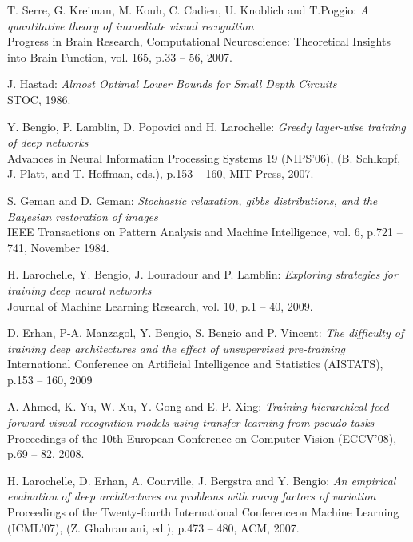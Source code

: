 \documentclass[a4paper,11pt]{report}
\begin{document}
\begin{thebibliography}{99}
	 T. Serre, G. Kreiman, M. Kouh, C. Cadieu, U. Knoblich and T.Poggio: {\em A quantitative theory of immediate visual recognition}\\
	Progress in Brain Research, Computational Neuroscience: Theoretical Insights into Brain Function, vol. 165, p.33 – 56, 2007.

	 J. Hastad: {\em Almost Optimal Lower Bounds for Small Depth Circuits}\\
	STOC, 1986.
	
	 Y. Bengio, P. Lamblin, D. Popovici and H. Larochelle: {\em Greedy layer-wise training of deep networks}\\
	Advances in Neural Information Processing Systems 19 (NIPS’06), (B. Schlkopf, J. Platt, and T. Hoffman, eds.), p.153 – 160, MIT Press, 2007.

	 S. Geman and D. Geman: {\em Stochastic relaxation, gibbs distributions, and the Bayesian restoration of images}\\
	IEEE Transactions on Pattern Analysis and Machine Intelligence, vol. 6, p.721 – 741, November 1984.

	 H. Larochelle, Y. Bengio, J. Louradour and P. Lamblin: {\em Exploring strategies for training deep neural networks}\\
	Journal of Machine Learning Research, vol. 10, p.1 – 40, 2009.
  
	 D. Erhan, P-A. Manzagol, Y. Bengio, S. Bengio and P. Vincent: {\em The difficulty of training deep architectures and the effect of unsupervised pre-training}\\
	International Conference on Artificial Intelligence and Statistics (AISTATS), p.153 – 160, 2009
  
	 A. Ahmed, K. Yu, W. Xu, Y. Gong and E. P. Xing: {\em Training hierarchical feed-forward visual recognition models using transfer learning from pseudo tasks}\\
	Proceedings of the 10th European Conference on Computer Vision (ECCV’08), p.69 – 82, 2008.
	
	 H. Larochelle, D. Erhan, A. Courville, J. Bergstra and Y. Bengio: {\em An empirical evaluation of deep architectures on problems with many factors of variation}\\
	Proceedings of the Twenty-fourth International Conferenceon Machine Learning (ICML’07), (Z. Ghahramani, ed.), p.473 – 480, ACM, 2007.
	

\end{thebibliography}
\end{document}
